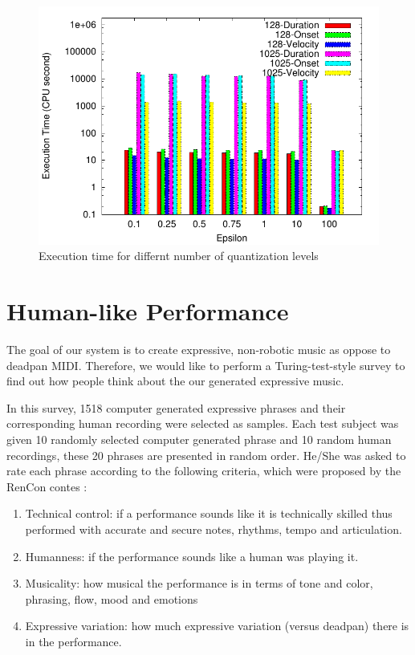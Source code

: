 \begin{figure}[tp]
   \begin{center}
      \includegraphics[width=\textwidth]{fig/quant_comp}
   \end{center}
   \caption{Execution time for differnt number of quantization levels}
   \label{fig:quant_comp}
\end{figure}

\section{Human-like Performance}
\label{sec:turing}
The goal of our system is to create expressive, non-robotic music as oppose to deadpan MIDI. Therefore, we would like to perform a Turing-test-style survey to find out how people think about the our generated expressive music.

In this survey, 1518 computer generated expressive phrases and their corresponding human recording were selected as samples. Each test subject was given 10 randomly selected computer generated phrase and 10 random human recordings, these 20 phrases are presented in random order. He/She was asked to rate each phrase according to the following criteria, which were proposed by the RenCon contes \cite{rencon}:
\begin{enumerate}
   \item Technical control: if a performance sounds like it is technically skilled thus performed with accurate and secure notes, rhythms, tempo and articulation.
   \item  Humanness: if the performance sounds like a human was playing it.
   \item  Musicality: how musical the performance is in terms of tone and color, phrasing, flow, mood and emotions
   \item Expressive variation: how much expressive variation (versus deadpan) there is in the performance.
\end{enumerate}

